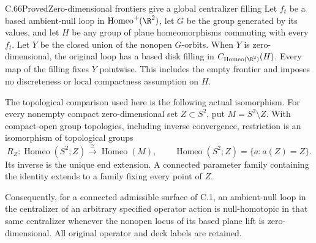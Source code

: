 \begin{claim}{C.66}{Proved}{Zero-dimensional frontiers give a global centralizer filling}
Let $f_t$ be a based ambient-null loop in
$\operatorname{Homeo}^+(\R^2)$, let $G$ be the group
generated by its values, and let $H$ be any group
of plane homeomorphisms commuting with every $f_t$.
Let $Y$ be the closed union of the nonopen $G$-orbits.
When $Y$ is zero-dimensional, the original loop
has a based disk filling in
$C_{\operatorname{Homeo}(\R^2)}(H)$.
Every map of the filling fixes $Y$ pointwise.
This includes the empty frontier and imposes no
discreteness or local compactness assumption on $H$.

The topological comparison used here is the following
actual isomorphism. For every nonempty compact
zero-dimensional set $Z\subset S^2$, put $M=S^2\setminus Z$.
With compact-open group topologies, including inverse
convergence, restriction is an isomorphism of topological
groups
\[
 R_Z:\operatorname{Homeo}(S^2;Z)
             \xrightarrow{\ \cong\ }\operatorname{Homeo}(M),
 \qquad \operatorname{Homeo}(S^2;Z)
       =\{a:a(Z)=Z\}.                                  \tag{C.66.1}
\]
Its inverse is the unique end extension.
A connected parameter family containing the identity
extends to a family fixing every point of $Z$.

Consequently, for a connected admissible surface of C.1,
an ambient-null loop in the centralizer of an arbitrary
specified operator action is null-homotopic in that
same centralizer whenever the nonopen locus of its
based plane lift is zero-dimensional. All original
operator and deck labels are retained.
\end{claim}

